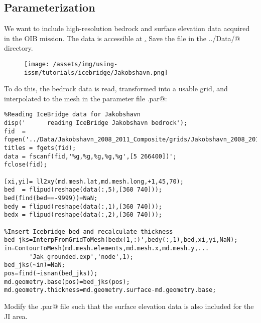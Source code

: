 \subsection{Parameterization} %
We want to include high-resolution bedrock and surface elevation data acquired in the OIB mission. The data is accessible at \href{http://data.cresis.ku.edu/data/grids/Jakobshavn_2008_2011_Composite_XYZGrid.txt}. Save the file in the \verb@../Data/@ directory.
\begin{figure}[H]
	\begin{center}
	\texttt{[image: /assets/img/using-issm/tutorials/icebridge/Jakobshavn.png]}
\end{center}
\end{figure}
To do this, the bedrock data is read, transformed into a usable grid, and interpolated to the mesh in the parameter file \verb@Greenland.par@:
\begin{verbatim}%Reading IceBridge data for Jakobshavn
disp('      reading IceBridge Jakobshavn bedrock');
fid  = fopen('../Data/Jakobshavn_2008_2011_Composite/grids/Jakobshavn_2008_2011_Composite_XYZGrid.txt');
titles = fgets(fid); 
data = fscanf(fid,'%g,%g,%g,%g,%g',[5 266400])';
fclose(fid);

[xi,yi]= ll2xy(md.mesh.lat,md.mesh.long,+1,45,70);
bed  = flipud(reshape(data(:,5),[360 740])); bed(find(bed==-9999))=NaN;
bedy = flipud(reshape(data(:,1),[360 740]));
bedx = flipud(reshape(data(:,2),[360 740]));

%Insert Icebridge bed and recalculate thickness
bed_jks=InterpFromGridToMesh(bedx(1,:)',bedy(:,1),bed,xi,yi,NaN);
in=ContourToMesh(md.mesh.elements,md.mesh.x,md.mesh.y,...
	   'Jak_grounded.exp','node',1);
bed_jks(~in)=NaN;
pos=find(~isnan(bed_jks));
md.geometry.base(pos)=bed_jks(pos);
md.geometry.thickness=md.geometry.surface-md.geometry.base;\end{verbatim}

Modify the \verb@Greenland.par@ file such that the surface elevation data is also included for the JI area.

\vspace{5cm}

